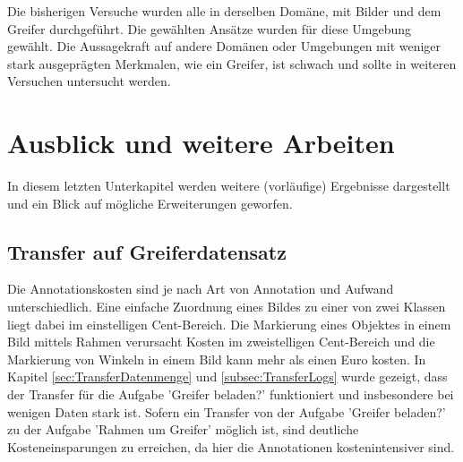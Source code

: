	Die bisherigen Versuche wurden alle in derselben Domäne, mit  Bilder und dem Greifer durchgeführt. Die gewählten Ansätze wurden für diese Umgebung gewählt. Die Aussagekraft auf andere Domänen oder Umgebungen mit weniger stark ausgeprägten Merkmalen, wie ein Greifer, ist schwach und sollte in weiteren Versuchen untersucht werden.    
							
	\section{Ausblick und weitere Arbeiten}
	\label{sec:AusblickWeitereArbeiten}
	In diesem letzten Unterkapitel werden weitere (vorläufige) Ergebnisse dargestellt und ein Blick auf mögliche Erweiterungen geworfen.

	\subsection{Transfer auf Greiferdatensatz}
	\label{subsec:TransferGreiferDatensatz}
 	Die Annotationskosten sind je nach Art von Annotation und Aufwand unterschiedlich. Eine einfache Zuordnung eines Bildes zu einer von zwei Klassen liegt dabei im einstelligen Cent-Bereich. Die Markierung eines Objektes in einem Bild mittels Rahmen verursacht Kosten im zweistelligen Cent-Bereich und die Markierung von Winkeln in einem Bild kann mehr als einen Euro kosten. In Kapitel \ref{sec:TransferDatenmenge} und \ref{subsec:TransferLogs} wurde gezeigt, dass der Transfer für die Aufgabe 'Greifer beladen?' funktioniert und insbesondere bei wenigen Daten stark ist. Sofern ein Transfer von der Aufgabe 'Greifer beladen?' zu der Aufgabe 'Rahmen um Greifer' möglich ist, sind deutliche Kosteneinsparungen zu erreichen, da hier die Annotationen kostenintensiver sind. 
 	
